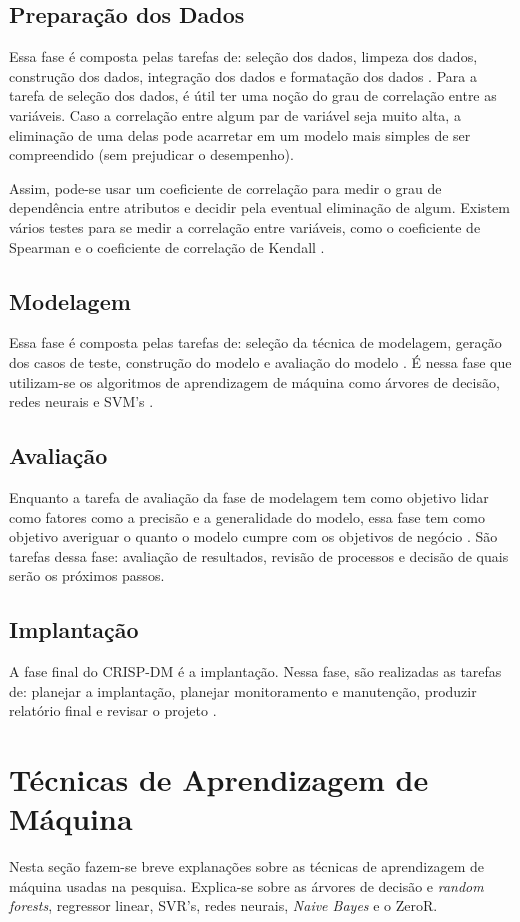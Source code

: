 \subsection{Preparação dos Dados}
Essa fase é composta pelas tarefas de: seleção dos dados, limpeza dos dados, construção
dos dados, integração dos dados e formatação dos dados \cite{crispdm}. Para a tarefa
de seleção dos dados, é útil ter uma noção do grau de correlação entre as variáveis. 
Caso a correlação entre algum par de variável seja muito alta, a eliminação de uma
delas pode acarretar em um modelo mais simples de ser compreendido (sem prejudicar o
desempenho).
\par Assim, pode-se usar um coeficiente de correlação para medir o grau de dependência
entre atributos e decidir pela eventual eliminação de algum. Existem vários testes
para se medir a correlação entre variáveis, como o coeficiente de Spearman e o
coeficiente de correlação de Kendall \cite{kendall}. 

\subsection{Modelagem} 
Essa fase é composta pelas tarefas de: seleção da técnica de modelagem, geração dos
casos de teste, construção do modelo e avaliação do modelo \cite{crispdm}. É nessa
fase que utilizam-se os algoritmos de aprendizagem de máquina como árvores de decisão,
redes neurais e SVM's \cite{ml_second_book}. 

\subsection{Avaliação} 
Enquanto a tarefa de avaliação da fase de modelagem tem como objetivo lidar como
fatores como a precisão e a generalidade do modelo, essa fase tem como objetivo
averiguar o quanto o modelo cumpre com os objetivos de negócio \cite{crispdm}. São
tarefas dessa fase: avaliação de resultados, revisão de processos e decisão de quais
serão os próximos passos. 

\subsection{Implantação} 
A fase final do CRISP-DM é a implantação. Nessa fase, são realizadas as tarefas de:
planejar a implantação, planejar monitoramento e manutenção, produzir relatório final
e revisar o projeto \cite{crispdm}.

\section{Técnicas de Aprendizagem de Máquina}
Nesta seção fazem-se breve explanações sobre as técnicas de aprendizagem de máquina
usadas na pesquisa. Explica-se sobre as árvores de decisão e \textit{random forests},
regressor linear, SVR's, redes neurais, \textit{Naive Bayes} e o ZeroR. 

